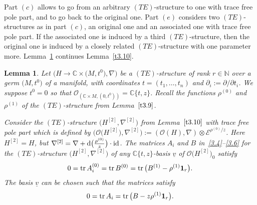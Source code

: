\documentclass[pdftex]{sigma}%
\numberwithin{equation}{section}
\numberwithin{figure}{section}
\newcommand{\N}{{\mathbb N}}
\newcommand{\C}{{\mathbb C}}
\newcommand{\EE}{{\mathcal E}}
\newcommand{\OO}{{\mathcal O}}
\newcommand{\uuuu}{\underline}
\newcommand{\paa}{\partial}
\newcommand{\nnn}{\nabla}
\DeclareMathOperator{\id}{id}
\DeclareMathOperator{\tr}{tr}
\newtheorem{Lemma}[Theorem]{Lemma}
\begin{document}
Part $(c)$ allows to go from an arbitrary $(TE)$-structure to one
with trace free pole part, and to go back to the original one.
Part $(e)$ considers two $(TE)$-structures as in part $(c)$,
an original one and an associated one with trace free pole part.
If the associated one is induced by a third $(TE)$-structure,
then the original one is induced by a closely related
$(TE)$-structure with one parameter more.
Lemma~\ref{t3.11} continues Lemma~\ref{t3.10}.


\begin{Lemma}\label{t3.11}
Let $\big(H\to\C\times \big(M,t^0\big),\nnn\big)$ be a $(TE)$-structure
of rank $r\in\N$ over a germ $\big(M,t^0\big)$ of a manifold,
with coordinates $t=(t_1,\dots ,t_n)$ and $\paa_i:=\paa/\paa t_i$.
We suppose $t^0=0$ so that $\OO_{(\C\times M,(0,t^0))}=\C\{t,z\}$.
Recall the functions $\rho^{(0)}$ and $\rho^{(1)}$
of the $(TE)$-structure from Lemma~$\ref{t3.9}$.

Consider the $(TE)$-structure
$\big(H^{[2]},\nnn^{[2]}\big)$ from Lemma~$\ref{t3.10}$
with trace free pole part which is defined by
$\big(\OO\big(H^{[2]}\big),\nnn^{[2]}\big):= (\OO(H),\nnn)\otimes \EE^{\rho^{(0)}/z}$.
Here $H^{[2]}=H$, but
$\nnn^{[2]}=\nnn+{\rm d}\big(\frac{\rho^{(0)}}{z}\big)\cdot\id$.
The matrices $A_i$ and $B$ in~\eqref{3.4}--\eqref{3.6}
for the $(TE)$-structure $\big(H^{[2]},\nnn^{[2]}\big)$
of any $\C\{t,z\}$-basis $\uuuu{v}$ of $\OO\big(H^{[2]}\big)_0$
satisfy
\begin{gather}\label{3.18}
0=\tr A_i^{(0)}=\tr B^{(0)}=\tr \big(B^{(1)}-\rho^{(1)}{\bf 1}_r\big).
\end{gather}
The basis $\uuuu{v}$ can be chosen such that
the matrices satisfy
\begin{eqnarray}\label{3.19}
0=\tr A_i=\tr\big(B-z\rho^{(1)}{\bf 1}_r\big).
\end{eqnarray}
\end{Lemma}
\end{document}
